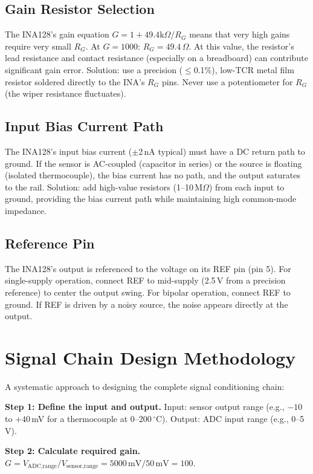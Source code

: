 \documentclass[11pt,letterpaper,twoside,openany]{book}
\newcommand{\degC}{\ensuremath{{}^{\circ}\text{C}}}
\begin{document}
\subsection{Gain Resistor Selection}
The INA128's gain equation $G = 1 + 49.4\text{k}\Omega / R_G$ means that very high gains require very small $R_G$. At $G = 1000$: $R_G = 49.4\,\Omega$. At this value, the resistor's lead resistance and contact resistance (especially on a breadboard) can contribute significant gain error. Solution: use a precision ($\leq$0.1\%), low-TCR metal film resistor soldered directly to the INA's $R_G$ pins. Never use a potentiometer for $R_G$ (the wiper resistance fluctuates).

\subsection{Input Bias Current Path}
The INA128's input bias current ($\pm$2\,nA typical) must have a DC return path to ground. If the sensor is AC-coupled (capacitor in series) or the source is floating (isolated thermocouple), the bias current has no path, and the output saturates to the rail. Solution: add high-value resistors (1--10\,M$\Omega$) from each input to ground, providing the bias current path while maintaining high common-mode impedance.

\subsection{Reference Pin}
The INA128's output is referenced to the voltage on its REF pin (pin 5). For single-supply operation, connect REF to mid-supply (2.5\,V from a precision reference) to center the output swing. For bipolar operation, connect REF to ground. If REF is driven by a noisy source, the noise appears directly at the output.

\section{Signal Chain Design Methodology}
A systematic approach to designing the complete signal conditioning chain:

\textbf{Step 1: Define the input and output.} Input: sensor output range (e.g., $-10$ to $+40$\,mV for a thermocouple at 0--200\,\degC{}). Output: ADC input range (e.g., 0--5\,V).

\textbf{Step 2: Calculate required gain.} $G = V_{\text{ADC,range}} / V_{\text{sensor,range}} = 5000\,\text{mV}/50\,\text{mV} = 100$.
\end{document}
